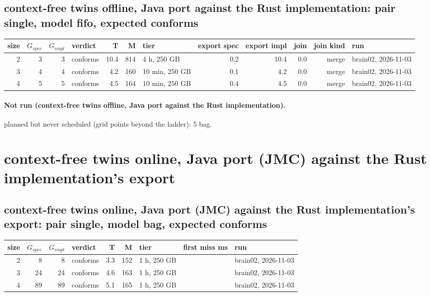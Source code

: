 \documentclass[10pt]{article}
\begin{document}
\subsection*{context-free twins offline, Java port against the Rust implementation: pair \textsf{single}, model fifo, expected conforms}
\begin{longtable}{@{}rrrlrrlrrrrl@{}}
\toprule
size & $G_{\mathit{spec}}$ & $G_{\mathit{impl}}$ & verdict & T & M & tier & export spec & export impl & join & join kind & run \\
\midrule
\endhead
\color{blue} 2 & 3 & 3 & conforms & 10.4 & 814 & 4 h, 250 GB & 0.2 & 10.4 & 0.0 & merge & brain02, 2026-11-03 \\
\color{blue} 3 & 4 & 4 & conforms & 4.2 & 160 & 10 min, 250 GB & 0.1 & 4.2 & 0.0 & merge & brain02, 2026-11-03 \\
\color{blue} 4 & 5 & 5 & conforms & 4.5 & 164 & 10 min, 250 GB & 0.4 & 4.5 & 0.0 & merge & brain02, 2026-11-03 \\
\bottomrule
\end{longtable}
\paragraph{Not run (context-free twins offline, Java port against the Rust implementation).}
planned but never scheduled (grid points beyond the ladder): 5 bag.\par
\section*{context-free twins online, Java port (JMC) against the Rust implementation's export}
\subsection*{context-free twins online, Java port (JMC) against the Rust implementation's export: pair \textsf{single}, model bag, expected conforms}
\begin{longtable}{@{}rrrlrrlrl@{}}
\toprule
size & $G_{\mathit{spec}}$ & $G_{\mathit{impl}}$ & verdict & T & M & tier & first miss ms & run \\
\midrule
\endhead
\color{red} 2 & 8 & 8 & conforms & 3.3 & 152 & 1 h, 250 GB &  & brain02, 2026-11-03 \\
\color{blue} 3 & 24 & 24 & conforms & 4.6 & 163 & 1 h, 250 GB &  & brain02, 2026-11-03 \\
\color{blue} 4 & 89 & 89 & conforms & 5.1 & 165 & 1 h, 250 GB &  & brain02, 2026-11-03 \\
\bottomrule
\end{longtable}
\end{document}
